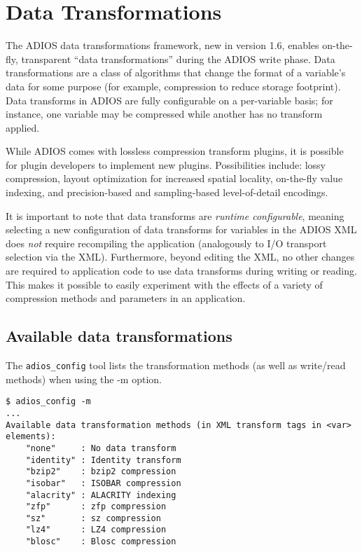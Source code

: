 \chapter{Data Transformations}
\label{sec:transform_plugins}
The ADIOS data transformations framework, new in version 1.6, enables on-the-fly, transparent ``data transformations'' during the ADIOS
write phase. Data transformations are a class of algorithms that change the format of a variable's data for some purpose
(for example, compression to reduce storage footprint).
Data transforms in ADIOS are fully configurable on a per-variable basis; for instance, one variable
may be compressed while another has no transform applied.

While ADIOS comes with lossless compression transform plugins, it is possible for plugin developers to implement new plugins.
Possibilities include: lossy compression, layout optimization for increased spatial locality,
on-the-fly value indexing, and precision-based and sampling-based level-of-detail encodings.

It is important to note that data transforms are \emph{runtime configurable}, meaning selecting a new configuration of data
transforms for variables in the ADIOS XML does \emph{not} require recompiling the application (analogously to I/O transport
selection via the XML). Furthermore, beyond editing the XML, no other changes are required to application code to use data
transforms during writing or reading. This makes it possible to easily experiment with the effects of a variety of compression
methods and parameters in an application.

\section{Available data transformations}
The \verb+adios_config+ tool lists the transformation methods (as well as write/read methods) when using the -m option.

\begin{lstlisting}
$ adios_config -m
...
Available data transformation methods (in XML transform tags in <var> elements):
    "none"     : No data transform
    "identity" : Identity transform
    "bzip2"    : bzip2 compression
    "isobar"   : ISOBAR compression
    "alacrity" : ALACRITY indexing
    "zfp"      : zfp compression
    "sz"       : sz compression
    "lz4"      : LZ4 compression
    "blosc"    : Blosc compression
\end{lstlisting}


